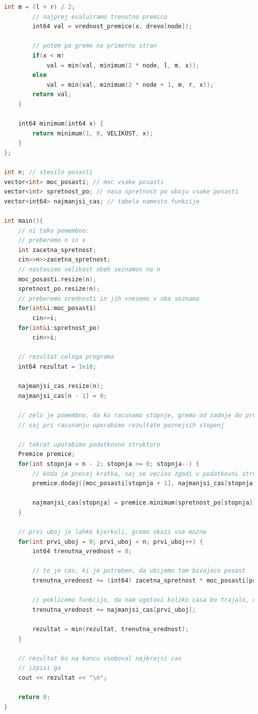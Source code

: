 \begin{lstlisting}[label={lst:code5}, language=C++]
        int m = (l + r) / 2;
        // najprej evaluiramo trenutno premico
        int64 val = vrednost_premice(x, drevo[node]);

        // potem pa gremo na primerno stran
        if(x < m)
            val = min(val, minimum(2 * node, l, m, x));
        else
            val = min(val, minimum(2 * node + 1, m, r, x));
        return val;
    }

    int64 minimum(int64 x) {
        return minimum(1, 0, VELIKOST, x);
    }
};

int n; // stevilo posasti
vector<int> moc_posasti; // moc vsake posasti
vector<int> spretnost_po; // nasa spretnost po uboju vsake posasti
vector<int64> najmanjsi_cas; // tabela namesto funkcije

int main(){
    // ni tako pomembno:
    // preberemo n in x
    int zacetna_spretnost;
    cin>>n>>zacetna_spretnost;
    // nastavimo velikost obeh seznamov na n
    moc_posasti.resize(n);
    spretnost_po.resize(n);
    // preberemo vrednosti in jih vnesemo v oba seznama
    for(int&i:moc_posasti)
        cin>>i;
    for(int&i:spretnost_po)
        cin>>i;

    // rezultat celega programa
    int64 rezultat = 1e18;

    najmanjsi_cas.resize(n);
    najmanjsi_cas[n - 1] = 0;

    // zelo je pomembno, da ko racunamo stopnje, gremo od zadnje do prve,
    // saj pri racunanju uporabimo rezultate poznejsih stopenj

    // tokrat uporabimo podatkovno strukturo
    Premice premice;
    for(int stopnja = n - 2; stopnja >= 0; stopnja--) {
        // koda je precej kratka, saj se vecina zgodi v podatkovni strukturi Premice
        premice.dodaj({moc_posasti[stopnja + 1], najmanjsi_cas[stopnja + 1]});

        najmanjsi_cas[stopnja] = premice.minimum(spretnost_po[stopnja]);
    }

    // prvi uboj je lahko kjerkoli, gremo skozi vse mozne
    for(int prvi_uboj = 0; prvi_uboj < n; prvi_uboj++) {
        int64 trenutna_vrednost = 0;

        // to je cas, ki je potreben, da ubijemo tam bivajoco posast
        trenutna_vrednost += (int64) zacetna_spretnost * moc_posasti[prvi_uboj];

        // poklicemo funkcijo, da nam ugotovi koliko casa bo trajalo, da pridemo do konca
        trenutna_vrednost += najmanjsi_cas[prvi_uboj];

        rezultat = min(rezultat, trenutna_vrednost);
    }

    // rezultat bo na koncu vseboval najkrajsi cas
    // izpisi ga
    cout << rezultat << "\n";

    return 0;
}
\end{lstlisting}